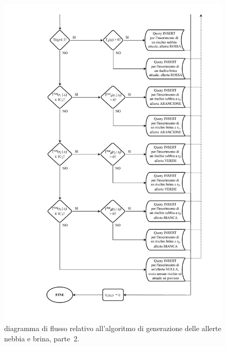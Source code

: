 \begin{figure}[h!]
	\centering
	\includegraphics[width=1\linewidth]{./Iterazione 3/OtherFiles/FC - Generatore allerte F&F(2).pdf}
	\caption{diagramma di flusso relativo all'algoritmo di generazione delle allerte nebbia e brina, parte~2.}
	\label{fig:FFFlowChart_2}
\end{figure}